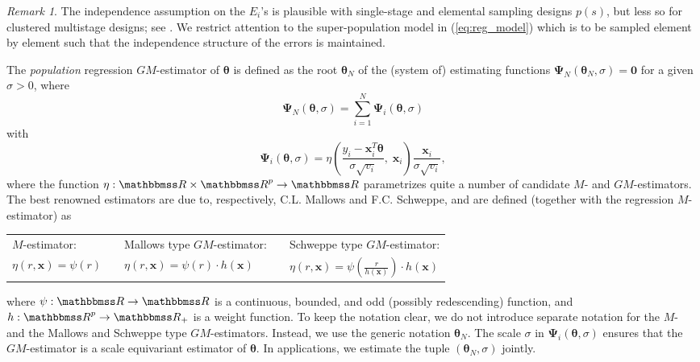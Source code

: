 \documentclass[a4paper,oneside,11pt,DIV=12]{scrartcl}
\newcommand{\R}{{\mathbbmss R}}         %
\theoremstyle{remark}
\newtheorem*{remark}{Remark}
\begin{document}
\begin{remark}
The independence assumption on the $E_i$'s is plausible with single-stage and elemental sampling designs $p(s)$, but less so for clustered multistage designs; see \citet[][Chap. 7]{sarndal_swensson_etal_1992}. We restrict attention to the super-population model in (\ref{eq:reg_model}) which is to be sampled element by element such that the independence structure of the errors is maintained.
\end{remark}

The \textit{population} regression $GM$-estimator of $\bm \theta$ is defined as the root $\bm \theta_{N}$ of the (system of) estimating functions $\bm \Psi_N(\bm \theta_N, \sigma) = \bm 0$ for a given $\sigma > 0$, where \citep[][Chap. 6.3]{hampel_ronchetti_etal_1986}
\begin{equation}\label{eq:gm_ee}
    \bm \Psi_N(\bm \theta, \sigma) = \sum_{i=1}^N \bm \Psi_i(\bm \theta, \sigma)
\end{equation}
with
\begin{equation}\label{eq:psi_gm}
    \bm \Psi_i(\bm \theta, \sigma) = \eta\left(\frac{y_i - \bm x_i^T \bm \theta}{\sigma \sqrt{v_i}}, \; \bm x_i\right) \frac{\bm x_i}{\sigma \sqrt{v_i}},
\end{equation}
where the function $\eta: \R \times \R^p \rightarrow \R$ parametrizes quite a number of candidate $M$- and $GM$-estimators. The best renowned estimators are due to, respectively, C.L. Mallows and F.C. Schweppe, and are defined (together with the regression $M$-estimator) as
\begin{center}
\begin{tabular}{lllll}
    $M$-estimator: && Mallows type $GM$-estimator: && Schweppe type $GM$-estimator: \\
    \addlinespace
    $\eta(r,\bm x) = \psi(r)$ && $\eta(r,\bm x) =\psi(r) \cdot h(\bm x)$ && $\eta(r,\bm x) = \displaystyle{\psi\left(\frac{r}{h(\bm x)}\right)} \cdot h(\bm x)$
\end{tabular}
\end{center}
where $\psi:\R \rightarrow \R$ is a continuous, bounded, and odd (possibly redescending) function, and $h: \R^p \rightarrow \R_+$ is a weight function. To keep the notation clear, we do not introduce separate notation for the $M$- and the Mallows and Schweppe type $GM$-estimators. Instead, we use the generic notation $\bm \theta_N$. The scale $\sigma$ in $\bm \Psi_i(\bm \theta, \sigma)$ ensures that the $GM$-estimator is a scale equivariant estimator of $\bm \theta$. In applications, we estimate the tuple $(\bm \theta_{N}, \sigma)$ jointly.
\end{document}
